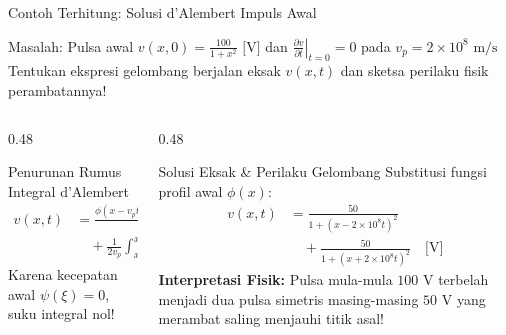 \documentclass[aspectratio=169,10pt]{beamer}
\begin{document}
\begin{frame}{Contoh Terhitung: Solusi d'Alembert Impuls Awal}
  \begin{exampleblock}{Masalah: Pulsa awal $v(x, 0) = \frac{100}{1 + x^2}\text{ [V]}$ dan $\left.\frac{\partial v}{\partial t}\right|_{t=0} = 0$ pada $v_p = 2 \times 10^8\text{ m/s}$}
    Tentukan ekspresi gelombang berjalan eksak $v(x, t)$ dan sketsa perilaku fisik perambatannya!
  \end{exampleblock}
  \begin{columns}[t]
    \begin{column}{0.48\textwidth}
      \begin{block}{Penurunan Rumus Integral d'Alembert}
        \begin{align*}
          v(x, t) &= \frac{\phi(x - v_p t) + \phi(x + v_p t)}{2} \\
                  &\quad + \frac{1}{2v_p}\int_{x-v_p t}^{x+v_p t} \psi(\xi)\,d\xi
        \end{align*}
        Karena kecepatan awal $\psi(\xi) = 0$, suku integral nol!
      \end{block}
    \end{column}
    \begin{column}{0.48\textwidth}
      \begin{alertblock}{Solusi Eksak \& Perilaku Gelombang}
        \small
        Substitusi fungsi profil awal $\phi(x)$:
        \begin{align*}
          v(x, t) &= \frac{50}{1 + (x - 2\times 10^8 t)^2} \\
                  &\quad + \frac{50}{1 + (x + 2\times 10^8 t)^2} \quad \text{[V]}
        \end{align*}
        \textbf{Interpretasi Fisik:}
        Pulsa mula-mula $100\text{ V}$ terbelah menjadi dua pulsa simetris masing-masing $50\text{ V}$ yang merambat saling menjauhi titik asal!
      \end{alertblock}
    \end{column}
  \end{columns}
\end{frame}
\end{document}
